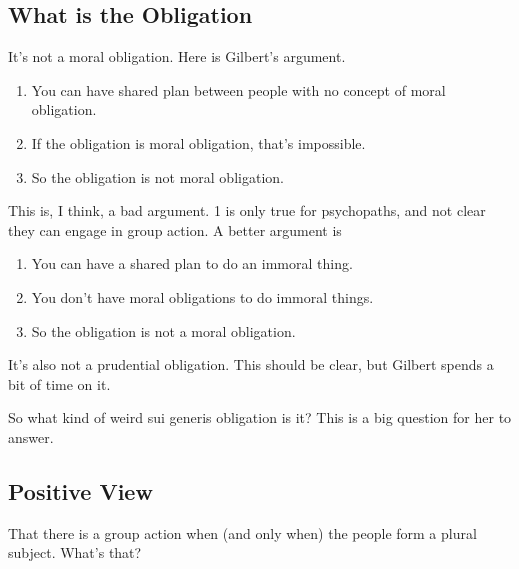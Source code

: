 \documentclass[11pt,]{article}
\providecommand{\tightlist}{%
  \setlength{\itemsep}{0pt}\setlength{\parskip}{0pt}}
\begin{document}
\hypertarget{what-is-the-obligation}{%
\subsection{What is the Obligation}\label{what-is-the-obligation}}

It's not a moral obligation. Here is Gilbert's argument.

\begin{enumerate}
\def\labelenumi{\arabic{enumi}.}
\tightlist
\item
  You can have shared plan between people with no concept of moral
  obligation.
\item
  If the obligation is moral obligation, that's impossible.
\item
  So the obligation is not moral obligation.
\end{enumerate}

This is, I think, a bad argument. 1 is only true for psychopaths, and
not clear they can engage in group action. A better argument is

\begin{enumerate}
\def\labelenumi{\arabic{enumi}.}
\tightlist
\item
  You can have a shared plan to do an immoral thing.
\item
  You don't have moral obligations to do immoral things.
\item
  So the obligation is not a moral obligation.
\end{enumerate}

It's also not a prudential obligation. This should be clear, but Gilbert
spends a bit of time on it.

So what kind of weird sui generis obligation is it? This is a big
question for her to answer.

\hypertarget{positive-view}{%
\subsection{Positive View}\label{positive-view}}

That there is a group action when (and only when) the people form a
plural subject. What's that?
\end{document}
